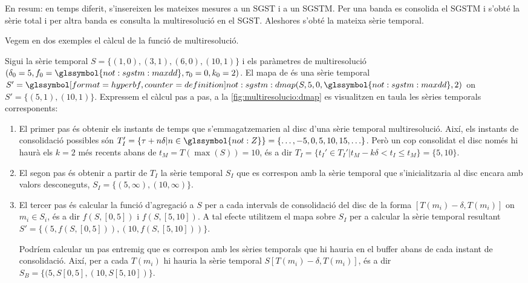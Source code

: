 En resum: en temps diferit, s'insereixen les mateixes mesures a un
\gls{SGST} i a un \gls{SGSTM}. Per una banda es consolida el
\gls{SGSTM} i s'obté la sèrie total i per altra banda es consulta la
multiresolució en el \gls{SGST}. Aleshores s'obté la mateixa sèrie
temporal. 


Vegem en dos exemples el càlcul de la funció de multiresolució. 

\begin{example}
  \label{ex:multiresolucio:dmap}
  Sigui la sèrie temporal $S=\{(1,0),(3,1),(6,0),(10,1)\}$ i els
  paràmetres de multiresolució
  $(\delta_0=5,f_0=\glssymbol{not:sgstm:maxdd},\tau_0=0,k_0=2)$.  El
  mapa de  és una sèrie temporal $S'=
  \glssymboldef{not:sgstm:dmap}(S,5,0,\glssymbol{not:sgstm:maxdd},2)$
  on $S'=\{(5,1),(10,1)\}$. Expressem el càlcul pas a pas, a la
  \autoref{fig:multiresolucio:dmap} es visualitzen en taula les sèries
  temporals corresponents:
  \begin{enumerate}
  \item El primer pas és obtenir els instants de temps que
    s'emmagatzemarien al disc d'una sèrie temporal
    multiresolució. Així, els instants de consolidació possibles són
    $T_I'=\{\tau+n\delta|n\in\glssymbol{not:Z}\}=
    \{\ldots,-5,0,5,10,15,\ldots\}$. Però un cop consolidat el disc
    només hi haurà els $k=2$ més recents abans de $t_M=T(\max(S))=10$,
    és a dir $T_I=\{t_I'\in T_I'|t_M - k\delta < t_I \leq
    t_M\}=\{5,10\}$.

  \item El segon pas és obtenir a partir de $T_I$ la sèrie temporal
    $S_I$ que es correspon amb la sèrie temporal que s'inicialitzaria
    al disc encara amb valors desconeguts,
    $S_I=\{(5,\infty),(10,\infty)\}$.



  \item El tercer pas és calcular la funció d'agregació a $S$ per a
    cada intervals de consolidació del disc de la forma
    $[T(m_i)-\delta,T(m_i)]$ on $m_i\in S_i$, és a dir $f(S,[0,5])$ i
    $f(S,[5,10])$. A tal efecte utilitzem el mapa sobre $S_I$ per a
    calcular la sèrie temporal resultant $S'=\{ (5,f(S,[0,5])),
    (10,f(S,[5,10])) \}$.

    Podríem calcular un pas entremig que es correspon amb les sèries
    temporals que hi hauria en el buffer abans de cada instant de
    consolidació. Així, per a cada $T(m_i)$ hi hauria la sèrie
    temporal $S[T(m_i)-\delta,T(m_i)]$, és a dir $S_B=\{
    (5,S[0,5],(10,S[5,10]) \}$.
  \end{enumerate}




\end{example}
